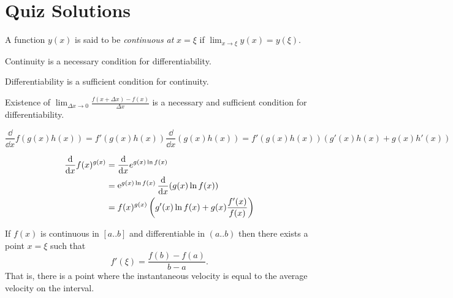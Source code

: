 \raggedbottom
\pagebreak
\flushbottom
\section{Quiz Solutions}


\begin{QuizSolution}
  \label{quiz solution define continuity}
  A function $y(x)$ is said to be \textit{continuous at} $x = \xi$ if
  $\lim_{x \to \xi} y(x) = y(\xi)$. 
\end{QuizSolution}


\begin{QuizSolution}
  \label{quiz solution necessary sufficient continuity differentiability}
  Continuity is a necessary condition for differentiability.

  Differentiability is a sufficient condition for continuity.

  Existence of $\lim_{\Delta x \to 0} \frac{f(x+\Delta x) - f(x)}{\Delta x}$ is a 
  necessary and sufficient condition for differentiability.
\end{QuizSolution}


\begin{QuizSolution}
  \label{quiz solution ddx f(g(x)h(x))}
  \[
  \frac{\dd}{\dd x} f(g(x) h(x)) 
  = f'(g(x) h(x)) \frac{\dd}{\dd x} (g(x) h(x))
  = f'(g(x) h(x)) (g'(x) h(x) + g(x) h'(x))
  \]
\end{QuizSolution}


\begin{QuizSolution}
  \label{quiz solution ddx f(x)g(x)}
  \begin{align*}
    \frac{\mathrm{d}}{\mathrm{d} x} f(x)^{g(x)} 
    &= \frac{\mathrm{d}}{\mathrm{d} x} e^{g(x) \ln f(x)} 
    \\
    &= \mathop{\mathrm{e}}\nolimits^{g(x) \ln f(x)} \frac{\mathrm{d}}{\mathrm{d} x} (g(x) \ln f(x)) 
    \\
    &= f(x)^{g(x)} \left( g'(x) \ln f(x) + g(x) \frac{f'(x)}{f(x)} \right)
  \end{align*}
\end{QuizSolution}


\begin{QuizSolution}
  \label{quiz solution theorem of the mean}
  If $f(x)$ is continuous in $[a..b]$ and differentiable in $(a..b)$ 
  then there exists a point $x = \xi$ such that
  \[
  f'(\xi) = \frac{f(b) - f(a)}{b - a}.
  \]
  That is, there is a point where the instantaneous velocity is equal to
  the average velocity on the interval. 
\end{QuizSolution}


